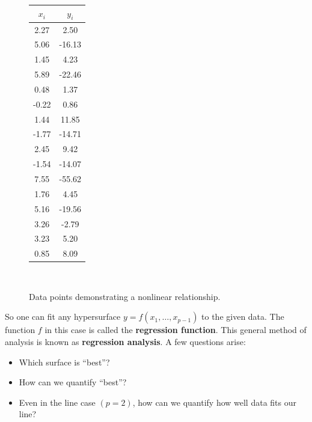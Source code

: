 \documentclass[a4paper, 12pt]{article}
\numberwithin{equation}{section}
\numberwithin{figure}{section}
\theoremstyle{definition}
\begin{document}
\begin{figure}[h]
	\centering
	\begin{minipage}{0.3\textwidth}
		\centering
		\begin{tabular}{cc}
			$x_i$ & $y_i$ \\ \hline
			2.27 & 2.50 \\
			5.06 & -16.13 \\ 
			1.45 & 4.23 \\ 
			5.89 & -22.46 \\
			0.48 & 1.37 \\ 
			-0.22 & 0.86 \\ 
			1.44 & 11.85 \\ 
			-1.77 & -14.71 \\ 
			2.45 & 9.42 \\ 
			-1.54 & -14.07 \\ 
			7.55 & -55.62 \\ 
			1.76 & 4.45 \\ 
			5.16 & -19.56 \\ 
			3.26 & -2.79 \\
			3.23 & 5.20 \\
			0.85 & 8.09
		\end{tabular}
	\end{minipage}~%
	\begin{minipage}{0.65\textwidth}
		\centering
	\end{minipage}
	\caption{Data points demonstrating a nonlinear relationship.}
	\label{fig:nonlinear-data}
\end{figure}

So one can fit any hypersurface $y=f(x_1,\dots, x_{p-1})$ to the given data. The
function $f$ in this case is called the \textbf{regression function}. This
general method of analysis is known as \textbf{regression analysis}. A few
questions arise:
\begin{itemize}
	\item Which surface is ``best''?
	\item How can we quantify ``best''?
	\item Even in the line case $(p=2)$, how can we quantify how well data fits
	our line? 
\end{itemize}
\end{document}
